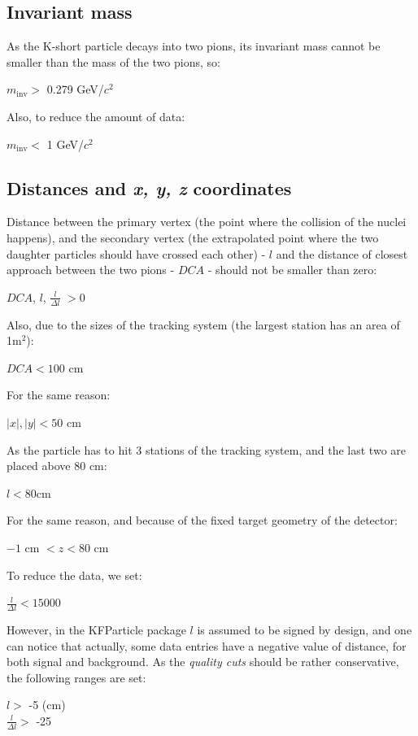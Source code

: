 \documentclass[12pt,a4paper]{report}
\begin{document}
\subsection{Invariant mass}
As the K-short particle decays into two pions, its invariant mass cannot be smaller than the mass of the two pions, so:
\begin{center}
    $m_\text{inv} >$ 0.279 GeV/$c^2$
\end{center}
Also, to reduce the amount of data:
\begin{center}
   $m_\text{inv} <$ 1 GeV/$c^2$
\end{center}

\subsection{Distances and \emph{x, y, z} coordinates}
Distance between the primary vertex (the point where the collision of the nuclei happens), and the secondary vertex (the extrapolated point where the two daughter particles should have crossed each other)  - $l$ and the distance of closest approach between the two pions - $DCA$ - should not be smaller than zero:
\begin{center}
    $DCA$, $l$, $\frac{l}{\Delta l}$ $> 0$
\end{center}

Also, due to the sizes of the tracking system (the largest station has an area of 1m$^2$):
\begin{center}
    $DCA < 100 $ cm
\end{center}
For the same reason:
\begin{center}
    $|x|, |y| < 50$ cm
\end{center}
As the particle has to hit 3 stations of the tracking system, and the last two are placed above 80 cm:
\begin{center}
    $l < 80$cm
\end{center}
For the same reason, and because of the fixed target geometry of the detector:
\begin{center}
    $-1$ cm $< z < 80$ cm
\end{center}
To reduce the data, we set:
\begin{center}
    $\frac{l}{\Delta l} < 15000$
\end{center}
However, in the KFParticle package $l$ is assumed to be signed by design, and one can notice that actually, some data entries have a negative value of distance, for both signal and background. As the \emph{quality cuts} should be rather conservative, the following ranges are set:
\begin{center}
     $l >$ -5 (cm)\\
     $\frac{l}{\Delta l} >$ -25
\end{center}
\end{document}
